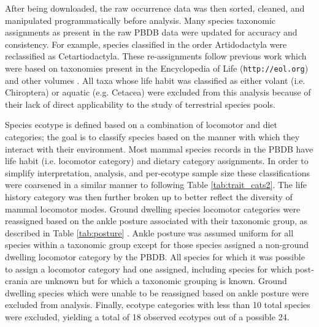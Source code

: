 After being downloaded, the raw occurrence data was then sorted, cleaned, and manipulated programmatically before analysis. Many species taxonomic assignments as present in the raw PBDB data were updated for accuracy and consistency. For example, species classified in the order Artidodactyla were reclassified as Cetartiodactyla. These re-assignments follow previous work \citep{Smits2015b} which were based on taxonomies present in the Encyclopedia of Life (\texttt{http://eol.org}) and other volumes \citep{Janis1998,Janis2008}. All taxa whose life habit was classified as either volant (i.e. Chiroptera) or aquatic (e.g. Cetacea) were excluded from this analysis because of their lack of direct applicability to the study of terrestrial species pools.

Species ecotype is defined based on a combination of locomotor and diet categories; the goal is to classify species based on the manner with which they interact with their environment. Most mammal species records in the PBDB have life habit (i.e. locomotor category) and dietary category assignments. In order to simplify interpretation, analysis, and per-ecotype sample size these classifications were coarsened in a similar manner to \citep{Smits2015b} following Table \ref{tab:trait_cats2}. The life history category was then further broken up to better reflect the diversity of mammal locomotor modes. Ground dwelling species locomotor categories were reassigned based on the ankle posture associated with their taxonomic group, as described in Table \ref{tab:posture} \citep{Carrano1999}. Ankle posture was assumed uniform for all species within a taxonomic group except for those species assigned a non-ground dwelling locomotor category by the PBDB. All species for which it was possible to assign a locomotor category had one assigned, including species for which post-crania are unknown but for which a taxonomic grouping is known. Ground dwelling species which were unable to be reassigned based on ankle posture were excluded from analysis. Finally, ecotype categories with less than 10 total species were excluded, yielding a total of 18 observed ecotypes out of a possible 24.

